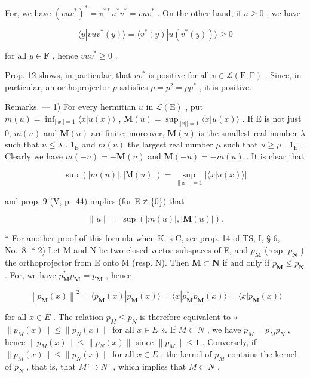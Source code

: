For, we have \((vuv^{*})^{*} = v^{**}u^{*}v^{*} = vuv^{*}\) . On the other hand, if \(u \geqslant 0\) , we have

\[
\langle y | v u v ^ {*} (y) \rangle = \langle v ^ {*} (y) | u (v ^ {*} (y)) \rangle \geqslant 0
\]

for all \(y \in \mathbf{F}\) , hence \(vuv^{*} \geqslant 0\) .

Prop. 12 shows, in particular, that \(vv^*\) is positive for all \(v \in \mathcal{L}(\mathrm{E};\mathrm{F})\) . Since, in particular, an orthoprojector \(p\) satisfies \(p = p^2 = pp^*\) , it is positive.

Remarks. --- 1) For every hermitian \(u\) in \(\mathcal{L}(\mathrm{E})\) , put \(m(u) = \inf_{||x|| = 1} \langle x|u(x) \rangle\) , \(\mathbf{M}(u) = \sup_{||x|| = 1} \langle x|u(x) \rangle\) . If E is not just 0, \(m(u)\) and \(\mathbf{M}(u)\) are finite; moreover, \(\mathbf{M}(u)\) is the smallest real number \(\lambda\) such that \(u \leqslant \lambda\) . \(1_{\mathrm{E}}\) and \(m(u)\) the largest real number \(\mu\) such that \(u \geqslant \mu\) . \(1_{\mathrm{E}}\) . Clearly we have \(m(-u) = -\mathbf{M}(u)\) and \(\mathbf{M}(-u) = -m(u)\) . It is clear that

\[
\sup \left(| m (u) |, | \mathrm{M} (u) |\right) = \sup _ {\| x \| = 1} \left| \langle x | u (x) \rangle \right|
\]

and prop. 9 (V, p.~44) implies (for E ≠ \{0\}) that

\[
\| u \| = \sup \left(| m (u) |, | \mathbf {M} (u) |\right).\tag{17}
\]

* For another proof of this formula when K is C, see prop. 14 of TS, I, § 6, No.~8. * 2) Let M and N be two closed vector subspaces of E, and \(p_{\mathbf{M}}\) (resp. \(p_{\mathbf{N}}\) ) the orthoprojector from E onto M (resp. N). Then \(\mathbf{M} \subset \mathbf{N}\) if and only if \(p_{\mathbf{M}} \leqslant p_{\mathbf{N}}\) . For, we have \(p_{\mathbf{M}}^{*}p_{\mathbf{M}} = p_{\mathbf{M}}\) , hence

\[
\left\| p _ {\mathbf {M}} (x) \right\| ^ {2} = \langle p _ {\mathbf {M}} (x) | p _ {\mathbf {M}} (x) \rangle = \langle x | p _ {\mathbf {M}} ^ {*} p _ {\mathbf {M}} (x) \rangle = \langle x | p _ {\mathbf {M}} (x) \rangle
\]

for all \(x \in E\) . The relation \(p_{M} \leqslant p_{N}\) is therefore equivalent to « \(\|p_{M}(x)\| \leqslant \|p_{N}(x)\|\) for all \(x \in E\) ». If \(M \subset N\) , we have \(p_{M} = p_{M} p_{N}\) , hence \(\|p_{M}(x)\| \leqslant \|p_{N}(x)\|\) since \(\|p_{M}\| \leqslant 1\) . Conversely, if \(\|p_{M}(x)\| \leqslant \|p_{N}(x)\|\) for all \(x \in E\) , the kernel of \(p_{M}\) contains the kernel of \(p_{N}\) , that is, that \(M^{\circ} \supset N^{\circ}\) , which implies that \(M \subset N\) .

